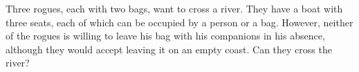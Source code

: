 \problem{}
Three rogues, each with two bags, want to cross a river.
They have a boat with three seats, each of which can be occupied by a person or
a bag.
However, neither of the rogues is willing to leave his bag with his companions
in his absence, although they would accept leaving it on an empty coast.
Can they cross the river?
\solution
\endproblem
